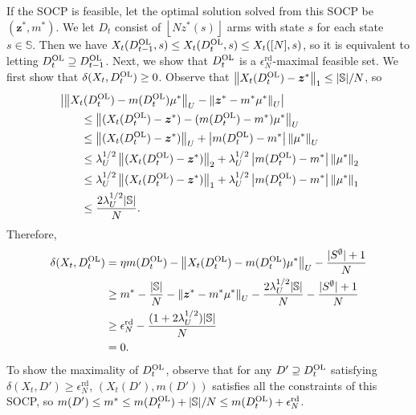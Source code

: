\documentclass[11pt,letterpaper]{article}
\theoremstyle{plain}
\theoremstyle{definition}
\theoremstyle{remark}
\newcommand{\norm}[1]{\left\lVert#1\right\rVert}
\newcommand{\abs}[1]{\left\lvert#1\right\rvert}
\newcommand{\floor}[1]{\left\lfloor#1\right\rfloor}
\newcommand{\ve}[1]{\bm{#1}}
\newcommand{\sspa}{\mathbb{S}}
\newcommand{\sempty}{S^{\emptyset}}
\newcommand{\statdist}{\mu^*}
\newcommand{\umat}{U}
\newcommand{\errtol}{\epsilon_N^{\text{rd}}}
\newcommand{\lamu}{\lambda_\umat}
\newcommand{\Db}{D^{\textup{OL}}}
\newcommand{\slk}{\delta}
\begin{document}
If the SOCP is feasible, let the optimal solution solved from this SOCP be $(\ve{z}^*, m^*)$. We let $D_t$ consist of $\floor{Nz^*(s)}$ arms with state $s$ for each state $s\in\sspa$. 
Then we have $X_t(\Db_{t-1}, s) \leq X_t(\Db_{t}, s) \leq X_t([N], s)$, so it is equivalent to letting $\Db_t \supseteq \Db_{t-1}$. 
Next, we show that $\Db_t$ is a $\errtol$-maximal feasible set. 
We first show that $\slk(X_t, \Db_t) \geq 0$. Observe that $\norm{X_t(\Db_t) - \ve{z}^*}_1 \leq |\sspa| / N$, so 
\begin{align*}
    &\abs{\norm{X_t(\Db_t) - m(\Db_t) \statdist}_\umat - \norm{\ve{z}^* - m^*\statdist}_\umat} \\
    &\qquad \leq \norm{(X_t(\Db_t) - \ve{z}^*) - (m(\Db_t) - m^*) \statdist}_\umat \\
    &\qquad \leq \norm{(X_t(\Db_t) - \ve{z}^*)}_\umat + \abs{m(\Db_t) - m^*}\norm{\statdist}_\umat \\
    &\qquad \leq \lamu^{1/2} \norm{(X_t(\Db_t) - \ve{z}^*)}_2 + \lamu^{1/2} \abs{m(\Db_t) - m^*}\norm{\statdist}_2 \\
    &\qquad\leq \lamu^{1/2}\norm{(X_t(\Db_t) - \ve{z}^*)}_1 + \lamu^{1/2}\abs{m(\Db_t) - m^*}\norm{\statdist}_1 \\
    &\qquad \leq \frac{2\lamu^{1/2}|\sspa|}{N}. 
\end{align*}
Therefore, 
\begin{align*}
    \slk(X_t, \Db_t) &= \eta m(\Db_t) - \norm{X_t(\Db_t) - m(\Db_t)\statdist}_{\umat} - \frac{|\sempty|+1}{N}   \\
    &\geq m^* -  \frac{|\sspa|}{N} - \norm{\ve{z}^* - m^*\statdist}_{\umat} - \frac{2\lamu^{1/2}|\sspa|}{N}  - \frac{|\sempty|+1}{N} \\
    &\geq \errtol - \frac{(1+2\lamu^{1/2})|\sspa|}{N} \\
    &= 0. 
\end{align*}
To show the maximality of $\Db_t$, observe that for any $D' \supseteq \Db_t$ satisfying $\slk(X_t, D') \geq \errtol$, $(X_t(D'), m(D'))$ satisfies all the constraints of this SOCP, so $m(D') \leq m^* \leq m(\Db_t)+|\sspa|/N \leq m(\Db_t)+\errtol$.  
\end{document}
